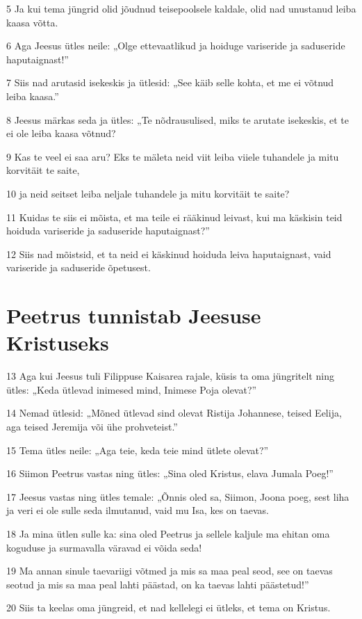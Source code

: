 \par 5 Ja kui tema jüngrid olid jõudnud teisepoolsele kaldale, olid nad unustanud leiba kaasa võtta.
\par 6 Aga Jeesus ütles neile: „Olge ettevaatlikud ja hoiduge variseride ja saduseride haputaignast!”
\par 7 Siis nad arutasid isekeskis ja ütlesid: „See käib selle kohta, et me ei võtnud leiba kaasa.”
\par 8 Jeesus märkas seda ja ütles: „Te nõdrausulised, miks te arutate isekeskis, et te ei ole leiba kaasa võtnud?
\par 9 Kas te veel ei saa aru? Eks te mäleta neid viit leiba viiele tuhandele ja mitu korvitäit te saite,
\par 10 ja neid seitset leiba neljale tuhandele ja mitu korvitäit te saite?
\par 11 Kuidas te siis ei mõista, et ma teile ei rääkinud leivast, kui ma käskisin teid hoiduda variseride ja saduseride haputaignast?”
\par 12 Siis nad mõistsid, et ta neid ei käskinud hoiduda leiva haputaignast, vaid variseride ja saduseride õpetusest.

\section*{Peetrus tunnistab Jeesuse Kristuseks}

\par 13 Aga kui Jeesus tuli Filippuse Kaisarea rajale, küsis ta oma jüngritelt ning ütles: „Keda ütlevad inimesed mind, Inimese Poja olevat?”
\par 14 Nemad ütlesid: „Mõned ütlevad sind olevat Ristija Johannese, teised Eelija, aga teised Jeremija või ühe prohveteist.”
\par 15 Tema ütles neile: „Aga teie, keda teie mind ütlete olevat?”
\par 16 Siimon Peetrus vastas ning ütles: „Sina oled Kristus, elava Jumala Poeg!”
\par 17 Jeesus vastas ning ütles temale: „Õnnis oled sa, Siimon, Joona poeg, sest liha ja veri ei ole sulle seda ilmutanud, vaid mu Isa, kes on taevas.
\par 18 Ja mina ütlen sulle ka: sina oled Peetrus ja sellele kaljule ma ehitan oma koguduse ja surmavalla väravad ei võida seda!
\par 19 Ma annan sinule taevariigi võtmed ja mis sa maa peal seod, see on taevas seotud ja mis sa maa peal lahti päästad, on ka taevas lahti päästetud!”
\par 20 Siis ta keelas oma jüngreid, et nad kellelegi ei ütleks, et tema on Kristus.

